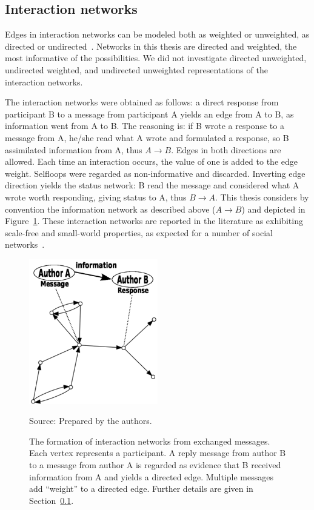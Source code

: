 \subsection{Interaction networks}\label{intNet}
Edges in interaction networks can be modeled both as weighted or unweighted, as directed or undirected~\cite{bird,newmanCommunityDirected,newmanCommunity2013}.
Networks in this thesis are directed and weighted, the most informative of the possibilities. We did not investigate directed unweighted, undirected weighted, and undirected unweighted representations of the interaction networks. 

The interaction networks were obtained as follows: a direct response from participant B to a message from participant A yields an edge from A to B, as information went from A to B. The reasoning is: if B wrote a response to a message from A, he/she read what A wrote and formulated a response, so B assimilated information from A, thus $A \rightarrow B$.
Edges in both directions are allowed. Each time an interaction occurs, the value of one is added to the edge weight. Selfloops were regarded as non-informative and discarded. Inverting edge direction yields the status network: B read the message and considered what A wrote worth responding, giving status to A, thus $B\rightarrow A$. This thesis considers by convention the information network as described above ($A\rightarrow B$) and depicted in Figure~\ref{formationNetwork}. These interaction networks are reported in the literature as exhibiting scale-free and small-world properties, as expected for a number of social networks~\cite{bird,newmanBook}.

\begin{figure}[!h]
\centering
\caption{The formation of interaction networks from exchanged messages. Each vertex represents a participant. A reply message from author B to a message from author A is regarded as evidence that B received information from A and yields a directed edge. 	Multiple messages add ``weight'' to a directed edge. Further details are given in Section~\ref{intNet}.}
\includegraphics[width=0.5\textwidth]{figs/criaRede3_}
\label{formationNetwork}
\begin{flushleft}
		Source: Prepared by the authors.\
\end{flushleft}
\end{figure}


